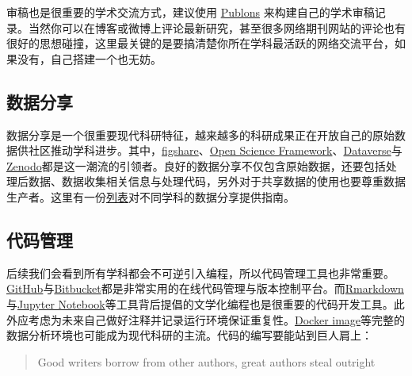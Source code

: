 \documentclass[]{tufte-book}
\begin{document}
审稿也是很重要的学术交流方式，建议使用 \href{https://publons.com/home/}{Publons} 来构建自己的学术审稿记录。当然你可以在博客或微博上评论最新研究，甚至很多网络期刊网站的评论也有很好的思想碰撞，这里最关键的是要搞清楚你所在学科最活跃的网络交流平台，如果没有，自己搭建一个也无妨。

\hypertarget{ux6570ux636eux5206ux4eab}{%
\subsection*{数据分享}\label{ux6570ux636eux5206ux4eab}}

数据分享是一个很重要现代科研特征，越来越多的科研成果正在开放自己的原始数据供社区推动学科进步。其中，\href{https://figshare.com/}{figshare}、\href{https://osf.io/}{Open Science Framework}、\href{https://dataverse.org/}{Dataverse}与\href{https://zenodo.org/}{Zenodo}都是这一潮流的引领者。良好的数据分享不仅包含原始数据，还要包括处理后数据、数据收集相关信息与处理代码，另外对于共享数据的使用也要尊重数据生产者。这里有一份\href{https://www.nature.com/sdata/policies/repositories}{列表}对不同学科的数据分享提供指南。

\hypertarget{ux4ee3ux7801ux7ba1ux7406}{%
\subsection*{代码管理}\label{ux4ee3ux7801ux7ba1ux7406}}

后续我们会看到所有学科都会不可逆引入编程，所以代码管理工具也非常重要。\href{https://github.com/}{GitHub}与\href{https://bitbucket.org/}{Bitbucket}都是非常实用的在线代码管理与版本控制平台。而\href{https://rmarkdown.rstudio.com/}{Rmarkdown}与\href{https://ipython.org/notebook.html}{Jupyter Notebook}等工具背后提倡的文学化编程也是很重要的代码开发工具。此外应考虑为未来自己做好注释并记录运行环境保证重复性。\href{https://docs.docker.com/get-started/}{Docker image}等完整的数据分析环境也可能成为现代科研的主流。代码的编写要能站到巨人肩上：

\begin{quote}
Good writers borrow from other authors, great authors steal outright
\end{quote}
\end{document}
